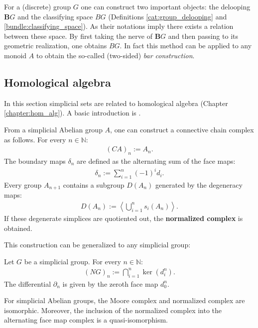     \begin{property}
        For a (discrete) group $G$ one can construct two important objects: the delooping $\mathbf{B}G$ and the classifying space $BG$ (Definitions \ref{cat:group_delooping} and \ref{bundle:classifying_space}). As their notations imply there exists a relation between these space. By first taking the nerve of $\mathbf{B}G$ and then passing to its geometric realization, one obtains $BG$. In fact this method can be applied to any monoid $A$ to obtain the so-called (two-sided) \textit{bar construction}.
    \end{property}

\subsection{Homological algebra}

    In this section simplicial sets are related to homological algebra (Chapter \ref{chapter:hom_alg}). A basic introduction is \cite{master2020homology}.

    \begin{construct}
        From a simplicial Abelian group $A$, one can construct a connective chain complex as follows. For every $n\in\mathbb{N}$:
        \begin{gather}
            (CA)_n := A_n.
        \end{gather}
        The boundary maps $\delta_n$ are defined as the alternating sum of the face maps:
        \begin{gather}
            \delta_n := \sum_{i=1}^n(-1)^id_i.
        \end{gather}
        Every group $A_{n+1}$ contains a subgroup $D(A_n)$ generated by the degeneracy maps:
        \begin{gather}
            D(A_n) := \left\langle\bigcup_{i=1}^ns_i(A_n)\right\rangle.
        \end{gather}
        If these degenerate simplices are quotiented out, the \textbf{normalized complex} is obtained.
    \end{construct}
    This construction can be generalized to any simplicial group:
    \begin{construct}
        Let $G$ be a simplicial group. For every $n\in\mathbb{N}$:
        \begin{gather}
            (NG)_n := \bigcap_{i=1}^n\ker(d^n_i).
        \end{gather}
        The differential $\partial_n$ is given by the zeroth face map $d^n_0$.
    \end{construct}
    \begin{property}[Equivalences]
        For simplicial Abelian groups, the Moore complex and normalized complex are isomorphic. Moreover, the inclusion of the normalized complex into the alternating face map complex is a quasi-isomorphism.
    \end{property}

